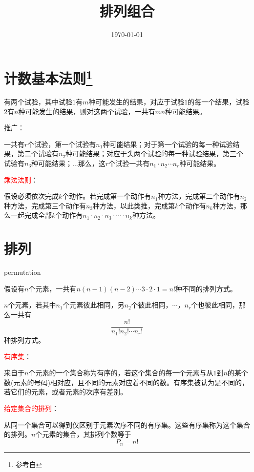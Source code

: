 \documentclass[12pt,a4paper]{article}
\title{排列组合}
\author{}
\date{\today}
\begin{document}
\maketitle

\section[Section Title]{计数基本法则\footnote{参考自\cite{GVK330306553}} }
有两个试验，其中试验$1$有$m$种可能发生的结果，对应于试验$1$的每一个结果，试验$2$有$n$种可能发生的结果，则对这两个试验，一共有$mn$种可能结果。

推广：

一共有$r$个试验，第一个试验有$n_1$种可能结果；对于第一个试验的每一种试验结果，第二个试验有$n_2$种可能结果；对应于头两个试验的每一种试验结果，第三个试验有$n_3$种可能结果；$\ldots$那么，这$r$个试验一共有$n_1 \cdot n_2 \cdots n_r$种可能结果。

\textcolor{red}{乘法法则}：

假设必须依次完成$k$个动作。若完成第一个动作有$n_1$种方法，完成第二个动作有$n_2$种方法，完成第三个动作有$n_3$种方法，以此类推，完成第$k$个动作有$n_k$种方法，那么一起完成全部$k$个动作有$n_1 \cdot n_2 \cdot n_3 \cdot \cdots \cdot n_k$种方法。



\section{排列}
permutation

假设有$n$个元素，一共有$n(n-1)(n-2)\cdots 3\cdot 2 \cdot 1 = n!$种不同的排列方式。

$n$个元素，若其中$n_1$个元素彼此相同，另$n_2$个彼此相同，$\cdots$，$n_r$个也彼此相同，那么一共有
\begin{equation}
\frac{n!}{n_1 ! n_2 ! \cdots n_r !}
\end{equation}
种排列方式。

\textcolor{red}{有序集}：

来自于$n$个元素的一个集合称为有序的，若这个集合的每一个元素与从$1$到$n$的某个数(元素的号码)相对应，且不同的元素对应着不同的数。有序集被认为是不同的，若它们的元素，或者元素的次序有差别。

\textcolor{red}{给定集合的排列}：

从同一个集合可以得到仅区别于元素次序不同的有序集。这些有序集称为这个集合的排列。$n$个元素的集合，其排列个数等于
\begin{equation}
P_n = n!
\end{equation}
\end{document}
